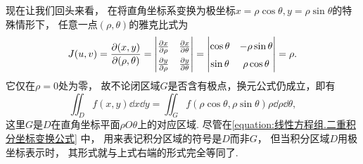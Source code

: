 现在让我们回头来看，
在将直角坐标系变换为极坐标\(x = \rho \cos\theta, y = \rho \sin\theta\)的特殊情形下，
任意一点\((\rho,\theta)\)的雅克比式为\[
	J(u,v)
	= \jacobi{x,y}{\rho,\theta}
	= {\def\arraystretch{1.5} \begin{vmatrix}
		\pdv{x}{\rho} & \pdv{x}{\theta} \\
		\pdv{y}{\rho} & \pdv{y}{\theta}
	\end{vmatrix}}
	= \begin{vmatrix}
		\cos\theta & -\rho \sin\theta \\
		\sin\theta & \rho \cos\theta
	\end{vmatrix}
	= \rho.
\]
它仅在\(\rho = 0\)处为零，
故不论闭区域\(G\)是否含有极点，换元公式仍成立，即有\[
	\iint_D f(x,y) \dd{x} \dd{y}
	= \iint_G f(\rho \cos\theta,\rho \sin\theta) \rho \dd{\rho} \dd{\theta},
\]
这里\(G\)是\(D\)在直角坐标平面\(\rho O \theta\)上的对应区域.
尽管在\cref{equation:线性方程组.二重积分坐标变换公式} 中，
用来表记积分区域的符号是\(D\)而非\(G\)，
但当积分区域\(D\)用极坐标表示时，
其形式就与上式右端的形式完全等同了.

